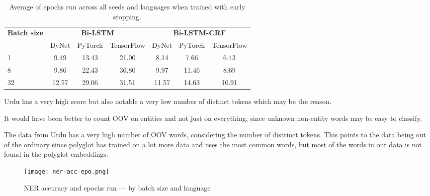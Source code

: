 \begin{table}[h!]
    \centering
    \begin{tabular}{l c c c|c c c}
        \toprule
        \multirow{2}{*}{\bfseries Batch size}     &
        \multicolumn{3}{c}{\bfseries Bi-LSTM}     &
        \multicolumn{3}{c}{\bfseries Bi-LSTM-CRF} \\
        \cmidrule(lr){2-7}
        & DyNet & PyTorch & TensorFlow
        & DyNet & PyTorch & TensorFlow \\
        \cmidrule(lr){1-7}
         1 &  9.49 & 13.43 & 21.00 &  8.14 &  7.66 &  6.43 \\
         8 &  9.86 & 22.43 & 36.80 &  9.97 & 11.46 &  8.69 \\
        32 & 12.57 & 29.06 & 31.51 & 11.57 & 14.63 & 10.91 \\
        \bottomrule
    \end{tabular}
    \caption{Average of epochs run across all seeds and languages when trained
        with early stopping.
        }\label{table:epochs-run-ner}
\end{table}

Urdu has a very high score but also notable a very low number of distinct tokens
which may be the reason.

It would have been better to count OOV on entities and not just on everything,
since unknown non-entity words may be easy to classify.

The data from Urdu has a very high number of OOV words, considering the number
of distrinct tokens. This points to the data being out of the ordinary since
polyglot has trained on a lot more data and uses the most common words, but 
most of the words in our data is not found in the polyglot embeddings.

\begin{figure}[h]
    \texttt{[image: ner-acc-epo.png]}
    \caption{NER accuracy and epochs run --- by batch size and language
    }\label{chart:ner-acc-epo}
\end{figure}

